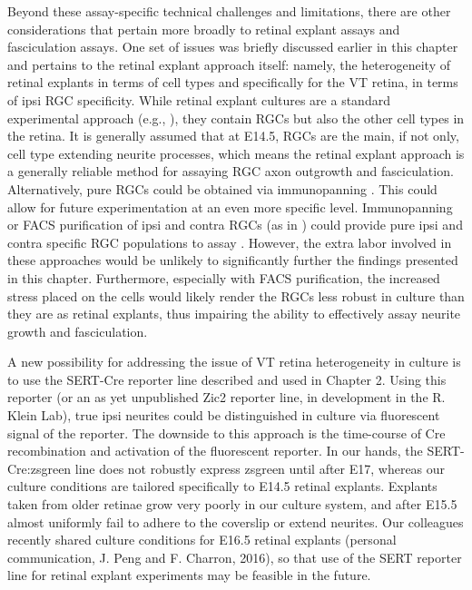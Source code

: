 Beyond these assay-specific technical challenges and limitations, there are other considerations that pertain more broadly to retinal explant assays and fasciculation assays.
One set of issues was briefly discussed earlier in this chapter and pertains to the retinal explant approach itself: namely, the heterogeneity of retinal explants in terms of cell types and specifically for the VT retina, in terms of ipsi RGC specificity.
While retinal explant cultures are a standard experimental approach (e.g., ), they contain RGCs but also the other cell types in the retina.
It is generally assumed that at E14.5, RGCs are the main, if not only, cell type extending neurite processes, which means the retinal explant approach is a generally reliable method for assaying RGC axon outgrowth and fasciculation.
Alternatively, pure RGCs could be obtained via immunopanning \cite{barres1988immunological}.
This could allow for future experimentation at an even more specific level.
Immunopanning or FACS purification of ipsi and contra RGCs (as in ) could provide pure ipsi and contra specific RGC populations to assay \invitro{}.
However, the extra labor involved in these approaches would be unlikely to significantly further the findings presented in this chapter.
Furthermore, especially with FACS purification, the increased stress placed on the cells would likely render the RGCs less robust in culture than they are as retinal explants, thus impairing the ability to effectively assay neurite growth and fasciculation.

A new possibility for addressing the issue of VT retina heterogeneity in culture is to use the SERT-Cre reporter line described and used in Chapter 2.
Using this reporter (or an as yet unpublished Zic2 reporter line, in development in the R. Klein Lab), true ipsi neurites could be distinguished in culture via fluorescent signal of the reporter.
The downside to this approach is the time-course of Cre recombination and activation of the fluorescent reporter.
In our hands, the SERT-Cre:zsgreen line does not robustly express zsgreen until after E17, whereas our culture conditions are tailored specifically to E14.5 retinal explants.
Explants taken from older retinae grow very poorly in our culture system, and after E15.5 almost uniformly fail to adhere to the coverslip or extend neurites.
Our colleagues recently shared culture conditions for E16.5 retinal explants (personal communication, J. Peng and F. Charron, 2016), so that use of the SERT reporter line for retinal explant experiments may be feasible in the future.

